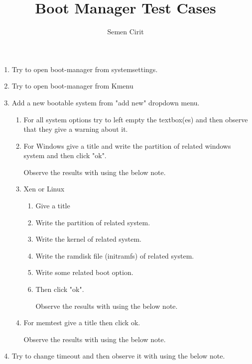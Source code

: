 \documentclass[a4paper,10pt]{article}
\title{Boot Manager Test Cases}
\author{Semen Cirit}
\begin{document}
\maketitle

\begin{enumerate}
    \item Try to open boot-manager from systemsettings. 
    \item Try to open boot-manager from Kmenu
    \item Add a new bootable system from "add new" dropdown menu.
    \begin{enumerate}
        \item For all system options try to left empty the textbox(es) and then observe that they give a warning about it.

        \item For Windows give a title and write the partition of related windows system and then click "ok".

            Observe the results with using the below note.


\item Xen or Linux 
\begin{enumerate}
    \item Give a title
    \item Write the partition of related system.
    \item Write the kernel of related system.
    \item Write the ramdisk file (initramfs) of related system.
    \item Write some related boot option.
    \item Then click "ok".

          Observe the results with using the below note.

\end{enumerate}

\item For memtest give a title then click ok.

    Observe the results with using the below note.

    \end{enumerate}
\item Try to change timeout and then observe it with using the below note.
\end{enumerate}
\end{document}
